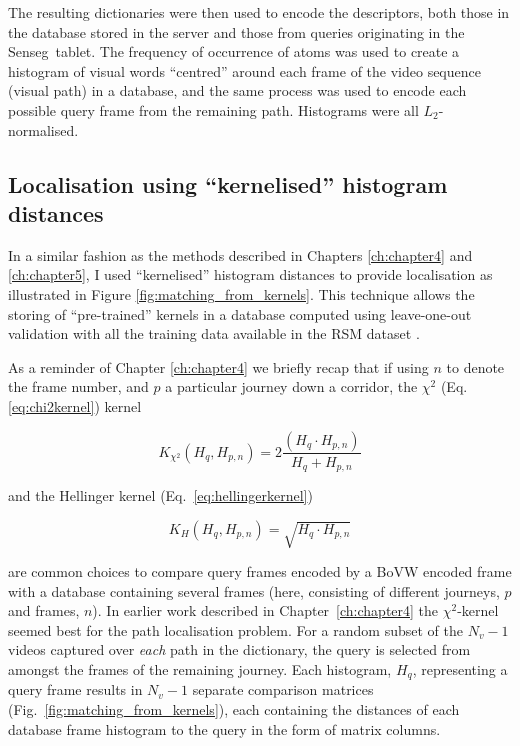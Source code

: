 The resulting dictionaries were then used to encode the descriptors, both those in the database stored in the server and those from queries originating in the Senseg\texttrademark\ tablet.  The frequency of occurrence of atoms was used to create a histogram of visual words ``centred'' around each frame of the video sequence (visual path) in a database, and the same process was used to encode each possible query frame from the remaining path. Histograms were all $L_2$-normalised.

\subsection{Localisation using ``kernelised'' histogram distances}
\label{sec:methods}

In a similar fashion as the methods described in Chapters \ref{ch:chapter4} and \ref{ch:chapter5}, I used ``kernelised'' histogram distances  to provide localisation as illustrated in Figure \ref{fig:matching_from_kernels}. This technique allows the storing of ``pre-trained'' kernels in a database computed using leave-one-out validation with all the training data available in the RSM dataset \citep{Rivera-RubioRSM}.

As a reminder of Chapter \ref{ch:chapter4} we briefly recap that if using $n$ to denote the frame number, and $p$ a particular journey down a corridor, the 
$\chi^2$ (Eq.\ref{eq:chi2kernel}) kernel

\begin{equation}
K_{\chi^2}(H_q, H_{p,n}) =  2 \frac{(H_q \cdot H_{p,n})}{H_q+H_{p,n}}
\label{eq:chi2kernel}
\end{equation}

and the Hellinger kernel (Eq.~\ref{eq:hellingerkernel})

\begin{equation}
K_{H}(H_q, H_{p,n}) =  \sqrt{H_q \cdot H_{p,n}}
\label{eq:hellingerkernel}
\end{equation}

are common choices to compare query frames encoded by a BoVW encoded frame with a database containing several frames (here, consisting of different journeys, $p$ and frames, $n$). In earlier work described in Chapter~\ref{ch:chapter4} the $\chi^2$-kernel seemed best for the path localisation problem.   For a random subset of the $N_v-1$ videos captured over \textit{each} path in the dictionary, the query is selected from amongst the frames of the remaining journey. Each histogram, $H_q$, representing a query frame results in $N_v-1$ separate comparison matrices (Fig.~\ref{fig:matching_from_kernels}), each containing the distances of each database frame histogram to the query in the form of matrix columns. 


